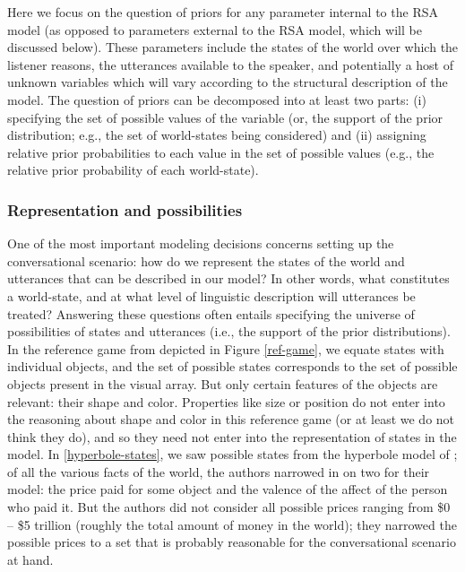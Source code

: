 \documentclass{sp}
\begin{document}
Here we focus on the question of priors for any parameter internal to the RSA model (as opposed to parameters external to the RSA model, which will be discussed below). 
These parameters include the states of the world over which the listener reasons, the utterances available to the speaker, and potentially a host of unknown variables which will vary according to the structural description of the model. 
The question of priors can be decomposed into at least two parts: (i) specifying the set of possible values of the variable (or, the support of the prior distribution; e.g., the set of world-states being considered) and (ii) assigning relative prior probabilities to each value in the set of possible values (e.g., the relative prior probability of each world-state). 

\subsubsection{Representation and possibilities}

One of the most important modeling decisions concerns setting up the conversational scenario: how do we represent the states of the world and utterances that can be described in our model? In other words, what constitutes a world-state, and at what level of linguistic description will utterances be treated? Answering these questions often entails specifying the universe of possibilities of states and utterances (i.e., the support of the prior distributions).
In the reference game from \cite{frankgoodman2012} depicted in Figure \ref{ref-game}, we equate states with individual objects, and the set of possible states corresponds to the set of possible objects present in the visual array. But only certain features of the objects are relevant: their shape and color. Properties like size or position do not enter into the reasoning about shape and color in this reference game (or at least we do not think they do), and so they need not enter into the representation of states in the model. In \ref{hyperbole-states}, we saw possible states from the hyperbole model of \cite{kaoetal2014}; of all the various facts of the world, the authors narrowed in on two for their model: the price paid for some object and the valence of the affect of the person who paid it. 
But the authors did not consider all possible prices ranging from \$0  -- \$5 trillion (roughly the total amount of money in the world); they narrowed the possible prices to a set that is probably reasonable for the conversational scenario at hand.
\end{document}
